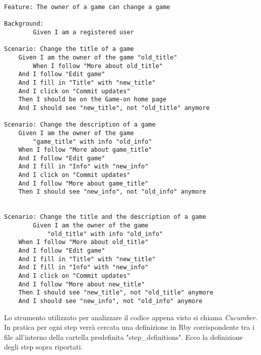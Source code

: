 \newpage
\begin{lstlisting}[language=Gherkin]
Feature: The owner of a game can change a game

Background:
        Given I am a registered user

Scenario: Change the title of a game
    Given I am the owner of the game "old_title"
        When I follow "More about old_title"
    And I follow "Edit game"
    And I fill in "Title" with "new_title"
    And I click on "Commit updates"
    Then I should be on the Game-on home page
    And I should see "new_title", not "old_title" anymore

Scenario: Change the description of a game
    Given I am the owner of the game 
        "game_title" with info "old_info"
    When I follow "More about game_title"
    And I follow "Edit game"
    And I fill in "Info" with "new_info"
    And I click on "Commit updates"
    And I follow "More about game_title"
    Then I should see "new_info", not "old_info" anymore


Scenario: Change the title and the description of a game
        Given I am the owner of the game 
            "old_title" with info "old_info"
    When I follow "More about old_title"
    And I follow "Edit game"
    And I fill in "Title" with "new_title"
    And I fill in "Info" with "new_info"	  
    And I click on "Commit updates" 
    And I follow "More about new_title"
    Then I should see "new_title", not "old_title" anymore
    And I should see "new_info", not "old_info" anymore
\end{lstlisting}

Lo strumento utilizzato per analizzare il codice appena visto si chiama \emph{Cucumber}. In pratica per ogni step verrà cercata una definizione in Rby corrispondente tra i file all'interno della cartella predefinita "step\_definitions". Ecco la definizione degli step sopra riportati.\\


